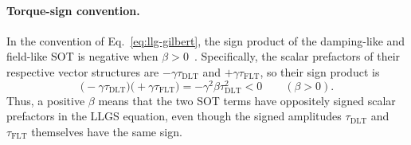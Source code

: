 \paragraph{Torque-sign convention.}
In the convention of Eq.~\eqref{eq:llg-gilbert}, the sign product of the
damping-like and field-like SOT is negative when
$\beta>0$~\cite{park2014macrospin,kong2026spatially}.  Specifically, the
scalar prefactors of their respective vector structures are
$-\gamma\tau_{\mathrm{DLT}}$ and $+\gamma\tau_{\mathrm{FLT}}$, so their sign
product is
\[
    \bigl(-\gamma\tau_{\mathrm{DLT}}\bigr)
    \bigl(+\gamma\tau_{\mathrm{FLT}}\bigr)
    = -\gamma^2\beta\tau_{\mathrm{DLT}}^2 < 0
    \qquad (\beta>0).
\]
Thus, a positive $\beta$ means that the two SOT terms have oppositely signed
scalar prefactors in the LLGS equation, even though the signed amplitudes
$\tau_{\mathrm{DLT}}$ and $\tau_{\mathrm{FLT}}$ themselves have the same sign.
